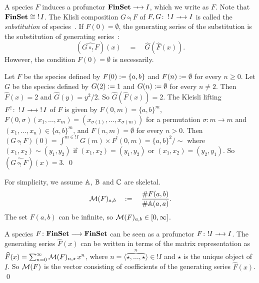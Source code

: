 A species \( F \) induces a profunctor \( \FinSet \profarrow I \), which we write as \( F \).
Note that \( \mathbf{FinSet} \cong \mathop{!}I \).
The Klisli composition \( G \circ_! F \) of \( F, G \colon \mathop{!}I \profarrow I \) is called the \emph{substitution} of species~\cite{FioreSpecies}.
If \( F(0) = \emptyset \), the generating series of the substitution is the substitution of generating series~\cite[Lem???]{Joyal?}:
\begin{equation*}
    (\widehat{G \circ_! F})(x)
    \quad=\quad
    \widehat{G}(\widehat{F}(x)).
\end{equation*}
However, the condition \( F(0) = \emptyset \) is necessarily.
\begin{example}\label{eg:matrix:species-counterexample}
    Let \( F \) be the species defined by \( F(0) := \{ a, b \} \) and \( F(n) := \emptyset \) for every \( n \ge 0 \).
    Let \( G \) be the species defined by \( G(2) := 1 \) and \( G(n) := \emptyset \) for every \( n \neq 2 \).
    Then \( \widehat{F}(x) = 2 \) and \( \widehat{G}(y) = y^2/2 \).
    So \( \widehat{G}(\widehat{F}(x)) = 2 \).
    The Kleisli lifting \( F^! \colon \mathop{!}I \profarrow \mathop{!}I \) of \( F \) is given by \( F(0,m) = \{ a, b \}^m \), \( F(0, \sigma)(x_1,\dots,x_m) = (x_{\sigma(1)}, \dots, x_{\sigma(m)}) \) for a permutation \( \sigma \colon m \to m \) and \( (x_1,\dots,x_n) \in \{ a,b \}^m \), and \( F(n,m) = \emptyset \) for every \( n > 0 \).
    Then \( (G \circ_! F)(0) = \int^{m \in \mathop{!}I} G(m) \times F^!(0, m) = \{ a, b \}^2/{\sim} \) where \( (x_1,x_2) \sim (y_1,y_2) \) if \( (x_1,x_2) = (y_1,y_2) \) or \( (x_1,x_2) = (y_2,y_1) \).
    So \( (\widehat{G \circ_! F})(x) = 3 \).
    \qed
\end{example}


For simplicity, we assume \( \mathbb{A} \), \( \mathbb{B} \) and \( \mathbb{C} \) are skeletal.
\begin{equation*}
    \mathcal{M}({F})_{a,b}
    \quad:=\quad
    \dfrac{\# F(a,b)}{\# \mathbb{A}(a,a)}.
\end{equation*}
The set \( F(a,b) \) can be infinite, so \( \mathcal{M}({F})_{a,b} \in [0, \infty] \).
\begin{remark}
    A species \( F \colon \mathbf{FinSet} \longrightarrow \mathbf{FinSet} \) can be seen as a profunctor \( F \colon {!}I \profarrow I \).
    The generating series \( \widehat{F}(x) \) can be written in terms of the matrix representation as \( \widehat{F}(x) = \sum_{n = 0}^{\infty} \mathcal{M}({F})_{n, \star}\, x^n \), where \( n = \langle \overbrace{\star, \dots, \star}^n \rangle \in {!}I \) and \( \star \) is the unique object of \( I \).
    So \( \mathcal{M}({F}) \) is the vector consisting of coefficients of the generating series \( \widehat{F}(x) \).
    \qed
\end{remark}

